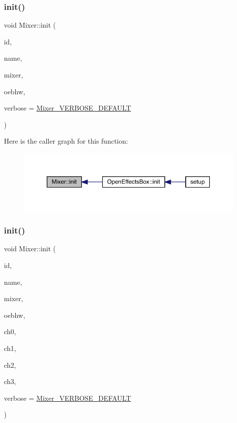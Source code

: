 \subsubsection{\texorpdfstring{init()}{init()}\hspace{0.1cm}{\footnotesize\ttfamily [1/2]}}
{\footnotesize\ttfamily void Mixer\+::init (\begin{DoxyParamCaption}\item[{int}]{id,  }\item[{char $\ast$}]{name,  }\item[{Audio\+Mixer4 $\ast$}]{mixer,  }\item[{\mbox{\hyperlink{class_open_effects_box_h_w}{Open\+Effects\+Box\+HW}} $\ast$}]{oebhw,  }\item[{int}]{verbose = {\ttfamily \mbox{\hyperlink{_mixer_8h_a7eb69210314d4537532d2124499318b3}{Mixer\+\_\+\+V\+E\+R\+B\+O\+S\+E\+\_\+\+D\+E\+F\+A\+U\+LT}}} }\end{DoxyParamCaption})}

Here is the caller graph for this function\+:\nopagebreak
\begin{figure}[H]
\begin{center}
\leavevmode
\includegraphics[width=350pt]{class_mixer_a2fb26b5f207f864ed15db5ae6ae69850_icgraph}
\end{center}
\end{figure}
\mbox{\label{class_mixer_ac6c290ada657f8325a59f37cafaf0c0c}} 
\subsubsection{\texorpdfstring{init()}{init()}\hspace{0.1cm}{\footnotesize\ttfamily [2/2]}}
{\footnotesize\ttfamily void Mixer\+::init (\begin{DoxyParamCaption}\item[{int}]{id,  }\item[{char $\ast$}]{name,  }\item[{Audio\+Mixer4 $\ast$}]{mixer,  }\item[{\mbox{\hyperlink{class_open_effects_box_h_w}{Open\+Effects\+Box\+HW}} $\ast$}]{oebhw,  }\item[{int}]{ch0,  }\item[{int}]{ch1,  }\item[{int}]{ch2,  }\item[{int}]{ch3,  }\item[{int}]{verbose = {\ttfamily \mbox{\hyperlink{_mixer_8h_a7eb69210314d4537532d2124499318b3}{Mixer\+\_\+\+V\+E\+R\+B\+O\+S\+E\+\_\+\+D\+E\+F\+A\+U\+LT}}} }\end{DoxyParamCaption})}

